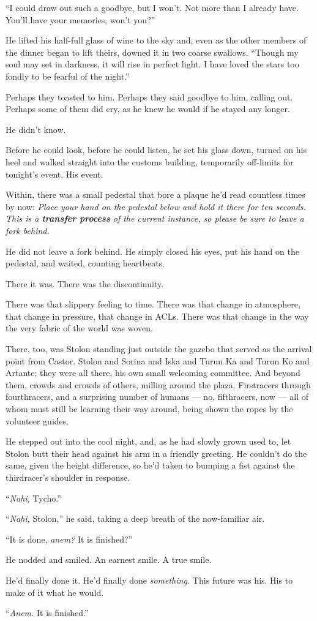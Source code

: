 ``I could draw out such a goodbye, but I won't. Not more than I already have. You'll have your memories, won't you?''

He lifted his half-full glass of wine to the sky and, even as the other members of the dinner began to lift theirs, downed it in two coarse swallows. ``Though my soul may set in darkness, it will rise in perfect light. I have loved the stars too fondly to be fearful of the night.''

Perhaps they toasted to him. Perhaps they said goodbye to him, calling out. Perhaps some of them did cry, as he knew he would if he stayed any longer.

He didn't know.

Before he could look, before he could listen, he set his glass down, turned on his heel and walked straight into the customs building, temporarily off-limits for tonight's event. His event.

Within, there was a small pedestal that bore a plaque he'd read countless times by now: \emph{Place your hand on the pedestal below and hold it there for ten seconds. This is a \textbf{transfer process} of the current instance, so please be sure to leave a fork behind.}

He did not leave a fork behind. He simply closed his eyes, put his hand on the pedestal, and waited, counting heartbeats.

There it was. There was the discontinuity.

There was that slippery feeling to time. There was that change in atmosphere, that change in pressure, that change in ACLs. There was that change in the way the very fabric of the world was woven.

There, too, was Stolon standing just outside the gazebo that served as the arrival point from Castor. Stolon and Sorina and Iska and Turun Ka and Turun Ko and Artante; they were all there, his own small welcoming committee. And beyond them, crowds and crowds of others, milling around the plaza. Firstracers through fourthracers, and a surprising number of humans — no, fifthracers, now — all of whom must still be learning their way around, being shown the ropes by the volunteer guides.

He stepped out into the cool night, and, as he had slowly grown used to, let Stolon butt their head against his arm in a friendly greeting. He couldn't do the same, given the height difference, so he'd taken to bumping a fist against the thirdracer's shoulder in response.

``\emph{Nahi,} Tycho.''

``\emph{Nahi,} Stolon,'' he said, taking a deep breath of the now-familiar air.

``It is done, \emph{anem?} It is finished?''

He nodded and smiled. An earnest smile. A true smile.

He'd finally done it. He'd finally done \emph{something.} This future was his. His to make of it what he would.

``\emph{Anem.} It is finished.''
